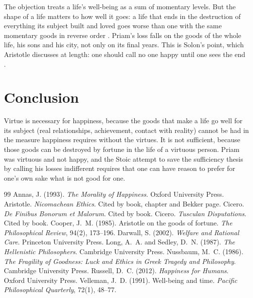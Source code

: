 \documentclass{situationist-preprint}
\begin{document}
\begin{reply}
The objection treats a life's well-being as a sum of momentary levels. But the shape of a life matters to how well it goes: a life that ends in the destruction of everything its subject built and loved goes worse than one with the same momentary goods in reverse order \citep{Velleman1991}. Priam's loss falls on the goods of the whole life, his sons and his city, not only on its final years. This is Solon's point, which Aristotle discusses at length: one should call no one happy until one sees the end \citep[I.10]{AristotleNE}.
\end{reply}

\section{Conclusion}

Virtue is necessary for happiness, because the goods that make a life go well for its subject (real relationships, achievement, contact with reality) cannot be had in the measure happiness requires without the virtues. It is not sufficient, because those goods can be destroyed by fortune in the life of a virtuous person. Priam was virtuous and not happy, and the Stoic attempt to save the sufficiency thesis by calling his losses indifferent requires that one can have reason to prefer for one's own sake what is not good for one.

\begin{thebibliography}{99}\small
{} Annas, J. (1993). \emph{The Morality of Happiness}. Oxford University Press.
 Aristotle. \emph{Nicomachean Ethics}. Cited by book, chapter and Bekker page.
 Cicero. \emph{De Finibus Bonorum et Malorum}. Cited by book.
 Cicero. \emph{Tusculan Disputations}. Cited by book.
 Cooper, J.~M. (1985). Aristotle on the goods of fortune. \emph{The Philosophical Review}, 94(2), 173--196.
 Darwall, S. (2002). \emph{Welfare and Rational Care}. Princeton University Press.
 Long, A.~A. and Sedley, D.~N. (1987). \emph{The Hellenistic Philosophers}. Cambridge University Press.
 Nussbaum, M.~C. (1986). \emph{The Fragility of Goodness: Luck and Ethics in Greek Tragedy and Philosophy}. Cambridge University Press.
 Russell, D.~C. (2012). \emph{Happiness for Humans}. Oxford University Press.
 Velleman, J.~D. (1991). Well-being and time. \emph{Pacific Philosophical Quarterly}, 72(1), 48--77.
\end{thebibliography}
\end{document}
